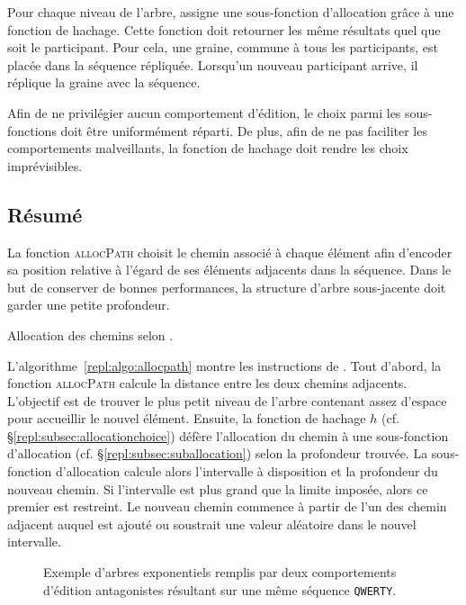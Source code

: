 Pour chaque niveau de l'arbre, \LSEQ assigne une sous-fonction d'allocation
grâce à une fonction de hachage. Cette fonction doit retourner les même
résultats quel que soit le participant. Pour cela, une graine, commune à tous
les participants, est placée dans la séquence répliquée. Lorsqu'un nouveau
participant arrive, il réplique la graine avec la séquence.

Afin de ne privilégier aucun comportement d'édition, le choix parmi les
sous-fonctions doit être uniformément réparti. De plus, afin de ne pas faciliter
les comportements malveillants, la fonction de hachage doit rendre les choix
imprévisibles.

\subsection{Résumé}

La fonction \textsc{allocPath} choisit le chemin associé à chaque élément afin
d'encoder sa position relative à l'égard de ses éléments adjacents dans la
séquence. Dans le but de conserver de bonnes performances, la structure d'arbre
sous-jacente doit garder une petite profondeur.

\begin{algorithm}
  
  \caption[Allocation des chemins selon \LSEQ]
  {\label{repl:algo:allocpath}Allocation des chemins selon \LSEQ.}
\end{algorithm}

L'algorithme~\ref{repl:algo:allocpath} montre les instructions de \LSEQ. Tout
d'abord, la fonction \textsc{allocPath} calcule la distance entre les deux
chemins adjacents. L'objectif est de trouver le plus petit niveau de l'arbre
contenant assez d'espace pour accueillir le nouvel élément.
Ensuite, la fonction de hachage $h$ (cf. §\ref{repl:subsec:allocationchoice})
défère l'allocation du chemin à une sous-fonction d'allocation
(cf. §\ref{repl:subsec:suballocation}) selon la profondeur trouvée. 
La sous-fonction d'allocation calcule alors l'intervalle à disposition et la
profondeur du nouveau chemin. Si l'intervalle est plus grand que la limite
imposée, alors ce premier est restreint. Le nouveau chemin commence à partir de
l'un des chemin adjacent auquel est ajouté ou soustrait une valeur aléatoire
dans le nouvel intervalle.

\begin{figure}
  \begin{center}
    \caption[Gestion des comportements d'édition par \LSEQ]
    {\label{repl:fig:lseqtreeexample} Exemple d'arbres exponentiels \LSEQ
      remplis par deux comportements d'édition antagonistes résultant sur une
      même séquence \texttt{QWERTY}.}
  \end{center}
\end{figure}

